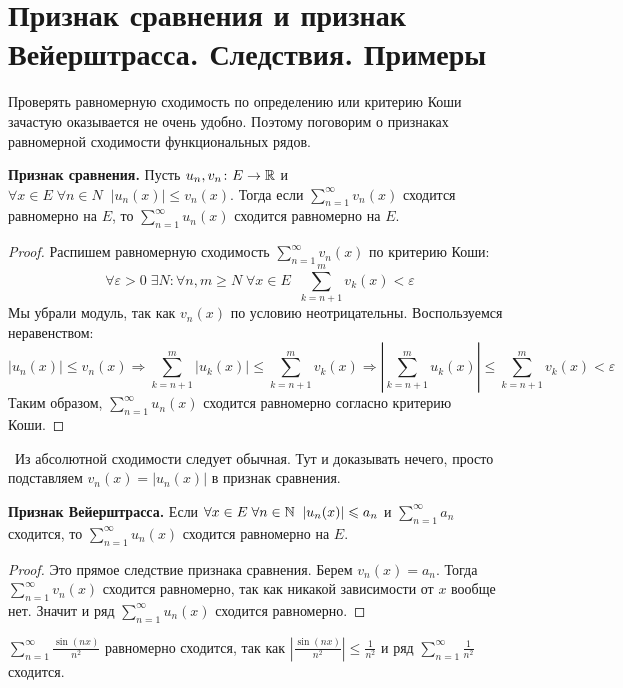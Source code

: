 \section{Признак сравнения и признак Вейерштрасса. Следствия. Примеры}
Проверять равномерную сходимость по определению или критерию Коши зачастую оказывается не очень удобно.
Поэтому поговорим о признаках равномерной сходимости функциональных рядов.

\textbf{Признак сравнения.}
Пусть $u_n, v_n\colon E \to \mathbb{R}$ и $\forall x \in E \; \forall n \in N \;\; |u_n(x)| \leqslant v_n(x)$.
Тогда если $\sum\limits_{n = 1}^\infty v_n(x)$ сходится равномерно на $E$, то $\sum\limits_{n = 1}^\infty u_n(x)$ сходится равномерно на $E$.

\begin{proof}
    Распишем равномерную сходимость $\sum\limits_{n = 1}^\infty v_n(x)$ по критерию Коши:
    \[ \forall \varepsilon > 0 \; \exists N : \forall n,m \geqslant N \; \forall x \in E \;\; \sum_{k=n+1}^m v_k(x) < \varepsilon \]
    \quad Мы убрали модуль, так как $v_n(x)$ по условию неотрицательны.
    Воспользуемся неравенством: \[ |u_n(x)| \leqslant v_n(x) \Longrightarrow \sum_{k = n + 1}^m |u_k(x)| \leqslant \sum_{k = n+1}^m v_k(x) \Longrightarrow \left| \sum_{k = n + 1}^m u_k(x) \right| \leqslant \sum_{k = n+1}^m v_k(x) < \varepsilon \]
    \quad Таким образом, $\sum\limits_{n = 1}^\infty u_n(x)$ сходится равномерно согласно критерию Коши.
\end{proof}

\follow \, Из абсолютной сходимости следует обычная.
Тут и доказывать нечего, просто подставляем $v_n(x) = |u_n(x)|$ в признак сравнения. 

\vspace*{7mm}

\textbf{Признак Вейерштрасса.} 
Если $\forall x \in E \; \forall n \in \mathbb{N} \;\; |u_n(x)| \leqslant a_n$ и $\sum\limits_{n = 1}^\infty a_n$ сходится, то $\sum\limits_{n = 1}^\infty u_n(x)$ сходится равномерно на $E$.
\begin{proof}
    Это прямое следствие признака сравнения.
    Берем $v_n(x) = a_n$. 
    Тогда $\sum\limits_{n = 1}^\infty v_n(x)$ сходится равномерно, так как никакой зависимости от $x$ вообще нет.
    Значит и ряд $\sum\limits_{n = 1}^\infty u_n(x)$ сходится равномерно.
\end{proof}

\begin{example}
    $\sum\limits_{n = 1}^\infty \frac{\sin(nx)}{n^2}$ равномерно сходится, так как $\left| \frac{\sin(nx)}{n^2} \right| \leqslant \frac{1}{n^2}$ и ряд $\sum\limits_{n = 1}^\infty \frac{1}{n^2}$ сходится.
\end{example}

